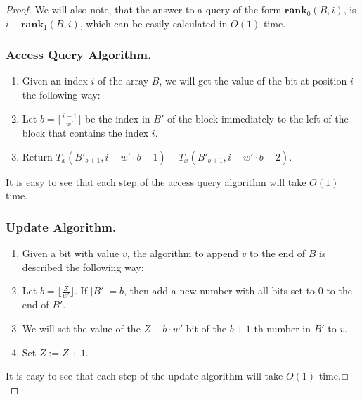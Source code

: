 \documentclass[runningheads]{llncs}
\begin{document}
\begin{proof}
        We will also note, that the answer to a query of the form $\textbf{rank}_0(B, i)$, is $i-\textbf{rank}_1(B, i)$,
        which can be easily calculated in $O(1)$ time.
         
    \subsubsection{Access Query Algorithm.}
    \begin{enumerate}
        \item[] Given an index $i$ of the array $B$, we will get the value of the bit at position $i$ the following way:
        \item Let $b=\lfloor \frac{i-1}{w'} \rfloor $ be the index in $B'$ of the block immediately to the left of the block that contains the index $i$.
        \item Return $T_{x}( B'_{b+1}, i-w'\cdot b -1 )-T_{x}(B'_{b+1}, i-w'\cdot b - 2 )$.
    \end{enumerate}

    It is easy to see that each step of the access query algorithm will take $O(1)$ time.

    \subsubsection{Update Algorithm.}
    \begin{enumerate}
        \item[] Given a bit with value $v$, the algorithm to append $v$ to the end of $B$ is described the following way:
        \item Let $b=\lfloor \frac{Z}{w'} \rfloor $. If $|B'|=b$, then add a new number with all bits set to $0$ to the end of $B'$.
        \item We will set the value of the $Z-b\cdot w'$ bit of the $b+1$-th number in $B'$ to $v$.
        \item Set $Z:=Z+1$.
    \end{enumerate}

    It is easy to see that each step of the update algorithm will take $O(1)$ time.$\qed$


\end{proof}
\end{document}
